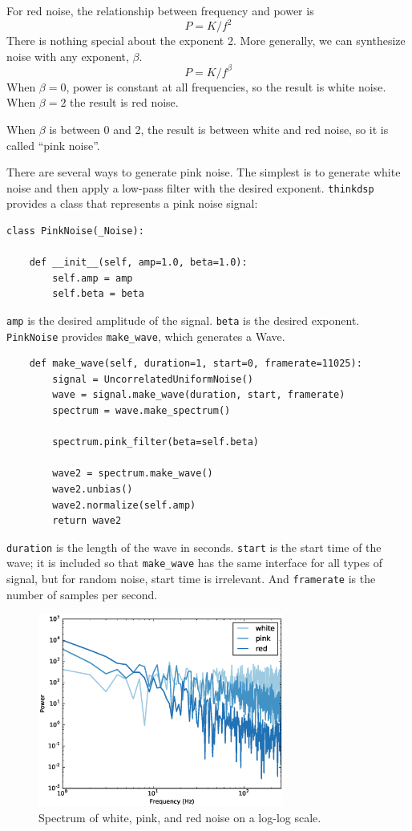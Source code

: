 \documentclass[12pt]{book}
\begin{document}
For red noise, the relationship between frequency
and power is
%
\[ P = K / f^{2} \]
%
There is nothing special about the exponent 2.  More generally,
we can synthesize noise with any exponent, $\beta$.
%
\[ P = K / f^{\beta} \]
%
When $\beta = 0$, power is constant at all frequencies,
so the result is white noise.  When $\beta=2$ the result is red noise.

When $\beta$ is between 0 and 2, the result is between white and
red noise, so it is called ``pink noise''.

There are several ways to generate pink noise.  The simplest is to
generate white noise and then apply a low-pass filter with the
desired exponent.  {\tt thinkdsp} provides a class that represents
a pink noise signal:

\begin{verbatim}
class PinkNoise(_Noise):

    def __init__(self, amp=1.0, beta=1.0):
        self.amp = amp
        self.beta = beta
\end{verbatim}

{\tt amp} is the desired amplitude of the signal.
{\tt beta} is the desired exponent.  {\tt PinkNoise} provides
\verb"make_wave", which generates a Wave.

\begin{verbatim}
    def make_wave(self, duration=1, start=0, framerate=11025):
        signal = UncorrelatedUniformNoise()
        wave = signal.make_wave(duration, start, framerate)
        spectrum = wave.make_spectrum()

        spectrum.pink_filter(beta=self.beta)

        wave2 = spectrum.make_wave()
        wave2.unbias()
        wave2.normalize(self.amp)
        return wave2
\end{verbatim}

{\tt duration} is the length of the wave in seconds.  {\tt start} is
the start time of the wave; it is included so that \verb"make_wave"
has the same interface for all types of signal, but for random noise,
start time is irrelevant.  And {\tt framerate} is the number of
samples per second.

\begin{figure}
\centerline{\includegraphics[height=2.5in]{figs/noise-triple.eps}}
\caption{Spectrum of white, pink, and red noise on a log-log scale.}
\label{fig.noise-triple}
\end{figure}
\end{document}
